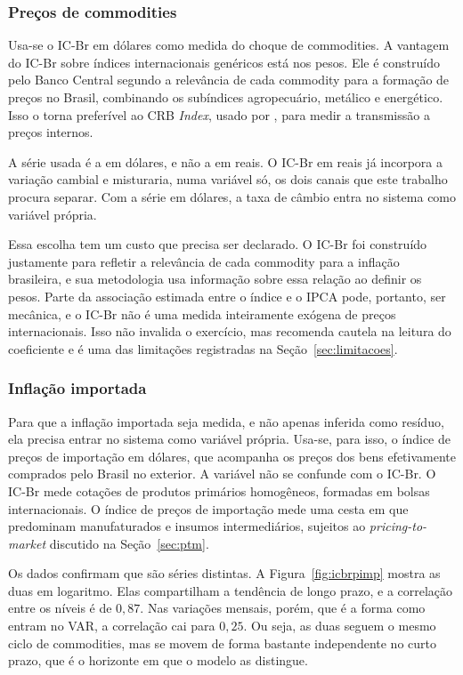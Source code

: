 \documentclass[12pt,openright,oneside,a4paper,portuguese,brazil]{abntex2}
\begin{document}
\subsubsection{Preços de commodities}

Usa-se o IC-Br em dólares como medida do choque de commodities. A vantagem do IC-Br sobre índices internacionais genéricos está nos pesos. Ele
é construído pelo Banco Central segundo a relevância de cada commodity para a
formação de preços no Brasil, combinando os subíndices agropecuário, metálico
e energético. Isso o torna preferível ao CRB \textit{Index}, usado por
, para medir a transmissão a preços internos.

A série usada é a em dólares, e não a em reais. O IC-Br em reais já incorpora
a variação cambial e misturaria, numa variável só, os dois canais que este
trabalho procura separar. Com a série em dólares, a taxa de câmbio entra no
sistema como variável própria.

Essa escolha tem um custo que precisa ser declarado. O IC-Br foi construído
justamente para refletir a relevância de cada commodity para a inflação
brasileira, e sua metodologia usa informação sobre essa relação ao definir os
pesos. Parte da associação estimada entre o índice e o IPCA pode, portanto,
ser mecânica, e o IC-Br não é uma medida inteiramente exógena de preços
internacionais. Isso não invalida o exercício, mas recomenda cautela na
leitura do coeficiente e é uma das limitações registradas na
Seção~\ref{sec:limitacoes}.

\subsubsection{Inflação importada}

Para que a inflação importada seja medida, e não apenas inferida como resíduo,
ela precisa entrar no sistema como variável própria. Usa-se, para isso, o
índice de preços de importação em dólares, que acompanha os preços dos bens
efetivamente comprados pelo Brasil no exterior. A variável não se confunde com o IC-Br. O IC-Br mede cotações de produtos
primários homogêneos, formadas em bolsas internacionais. O índice de preços de
importação mede uma cesta em que predominam manufaturados e insumos
intermediários, sujeitos ao \textit{pricing-to-market} discutido na
Seção~\ref{sec:ptm}.

Os dados confirmam que são séries distintas. A Figura~\ref{fig:icbrpimp} mostra
as duas em logaritmo. Elas compartilham a tendência de longo prazo, e a
correlação entre os níveis é de $0{,}87$. Nas variações mensais, porém, que é a
forma como entram no VAR, a correlação cai para $0{,}25$. Ou seja, as duas
seguem o mesmo ciclo de commodities, mas se movem de forma bastante
independente no curto prazo, que é o horizonte em que o modelo as distingue.
\end{document}
